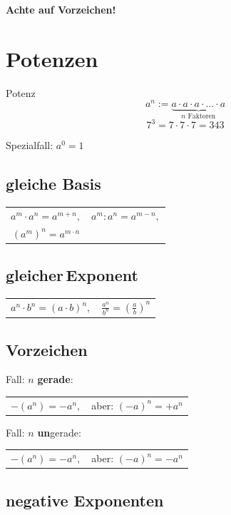 \begin{multicols}{2}
\begin{enumerate}
\textbf{\color{red}Achte auf Vorzeichen!}
\end{enumerate}


\hrulefill
\section*{Potenzen}
\begin{definition*}{Potenz}{}
$$a^n := \underbrace{a\cdot{}a\cdot{}a\cdot{}...\cdot{}a}_{n\textrm{ Faktoren}}$$
$$7^3=7\cdot{}7\cdot{}7=343$$

Spezialfall:
$a^0=1$
\end{definition*}

\subsection*{gleiche Basis}
\begin{tabular}{cc}
$a^m\cdot{}a^n = a^{m+n},$ & $a^m:a^n=a^{m-n},$ \\
$\left(a^m\right)^n = a^{m\cdot{}n}$ &\\
 \end{tabular} 

\subsection*{gleicher\,Exponent}
\begin{tabular}{cc}
$a^n\cdot{}b^n = (a\cdot{}b)^n,$ & $\frac{a^n}{b^n} =\left(\frac{a}b\right)^n $\\
 \end{tabular}

\subsection*{Vorzeichen}
Fall: $n$ \textbf{gerade}:

\begin{tabular}{cc}
 $-(a^n) = -a^n,$ & aber: $(-a)^n = +a^n$\\
 \end{tabular} 

Fall: $n$ \textbf{un}gerade:

\begin{tabular}{cc}
 $-(a^n) = -a^n,$ & aber: $(-a)^n = -a^n$\\
 \end{tabular} 


\subsection*{negative Exponenten}


\end{multicols}
